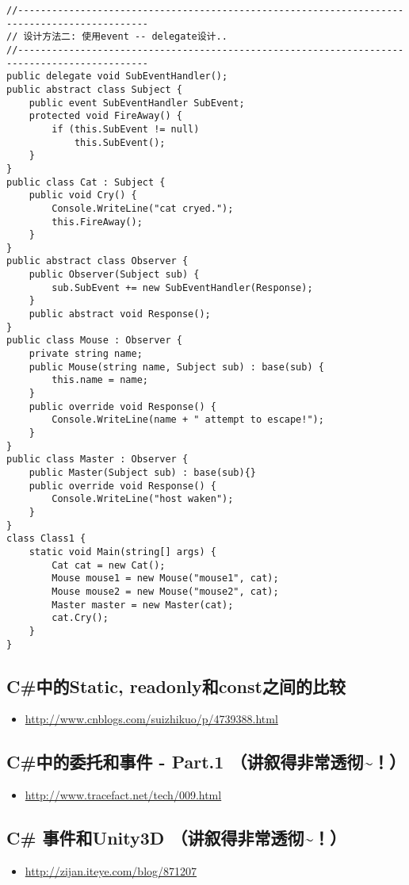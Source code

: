 \documentclass[9pt, b5paper]{article}
\begin{document}
\begin{itemize}
\begin{verbatim}
//---------------------------------------------------------------------------------------------
// 设计方法二: 使用event -- delegate设计..
//---------------------------------------------------------------------------------------------
public delegate void SubEventHandler();
public abstract class Subject {
    public event SubEventHandler SubEvent;
    protected void FireAway() {
        if (this.SubEvent != null)
            this.SubEvent();
    }   
}
public class Cat : Subject {  
    public void Cry() {
        Console.WriteLine("cat cryed.");
        this.FireAway();
    }
}
public abstract class Observer {
    public Observer(Subject sub) {
        sub.SubEvent += new SubEventHandler(Response);
    }
    public abstract void Response();    
}
public class Mouse : Observer {
    private string name;
    public Mouse(string name, Subject sub) : base(sub) {   
        this.name = name;
    }
    public override void Response() {
        Console.WriteLine(name + " attempt to escape!");
    }
}
public class Master : Observer {
    public Master(Subject sub) : base(sub){}
    public override void Response() {
        Console.WriteLine("host waken");
    }
}
class Class1 {
    static void Main(string[] args) {
        Cat cat = new Cat();
        Mouse mouse1 = new Mouse("mouse1", cat);
        Mouse mouse2 = new Mouse("mouse2", cat);
        Master master = new Master(cat);
        cat.Cry();
    }
}
\end{verbatim}
\end{itemize}

\subsection{C\#中的Static, readonly和const之间的比较}
\label{sec-1-3}
\begin{itemize}
\item \url{http://www.cnblogs.com/suizhikuo/p/4739388.html}
\end{itemize}

\subsection{C\#中的委托和事件 - Part.1 （讲叙得非常透彻\textasciitilde{}！）}
\label{sec-1-4}
\begin{itemize}
\item \url{http://www.tracefact.net/tech/009.html}
\end{itemize}

\subsection{C\# 事件和Unity3D （讲叙得非常透彻\textasciitilde{}！）}
\label{sec-1-5}
\begin{itemize}
\item \url{http://zijan.iteye.com/blog/871207}
\end{itemize}
\end{document}
